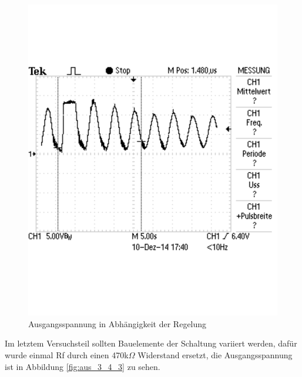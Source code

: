 \documentclass[12pt,a4paper]{article}
\begin{document}
\begin{figure}[H] 
  \centering
    \includegraphics[trim = 0mm 50mm 0mm 50mm, clip, scale = 0.6]{TEK0008.pdf}
  	\caption[Ausgangsspannung in Abhängigkeit der Regelung]{Ausgangsspannung in Abhängigkeit der Regelung}
  \label{fig:aus_3_4_2}
\end{figure}

Im letztem Versuchsteil sollten Bauelemente der Schaltung variiert werden, dafür wurde einmal Rf durch einen 470k$\Omega$ Widerstand ersetzt, die Ausgangsspannung ist in Abbildung \ref{fig:aus_3_4_3} zu sehen.
\end{document}
